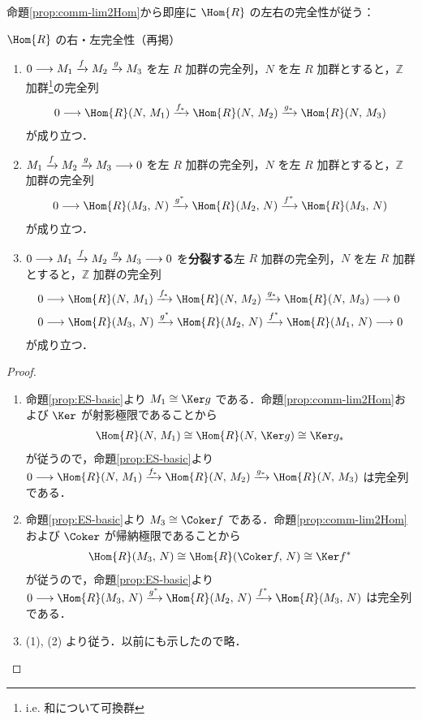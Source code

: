 \documentclass[algtopo_main]{subfiles}
\begin{document}
命題\ref{prop:comm-lim2Hom}から即座に $\Hom{R}$ の左右の完全性が従う：
\begin{mycol}[]{$\Hom{R}$ の右・左完全性（再掲）}
	\begin{enumerate}
        \item $0 \longrightarrow M_1 \xrightarrow{f} M_2 \xrightarrow{g} M_3$ を左 $R$ 加群の完全列，$N$ を左 $R$ 加群とすると，$\mathbb{Z}$ 加群\footnote{i.e. 和について可換群}の完全列
        \begin{align}
            0 \lto \Hom{R}(N,\, M_1) \xrightarrow{f_*} \Hom{R}(N,\, M_2) \xrightarrow{g_*} \Hom{R}(N,\, M_3)
        \end{align}
        が成り立つ．
        \item $M_1 \xrightarrow{f} M_2 \xrightarrow{g} M_3 \longrightarrow 0$ を左 $R$ 加群の完全列，$N$ を左 $R$ 加群とすると，$\mathbb{Z}$ 加群の完全列
        \begin{align}
            0 \lto \Hom{R}(M_3,\, N) \xrightarrow{g^*} \Hom{R}(M_2,\, N) \xrightarrow{f^*} \Hom{R}(M_3,\, N)
        \end{align}
        が成り立つ．
        \item $0 \longrightarrow M_1 \xrightarrow{f} M_2 \xrightarrow{g} M_3 \longrightarrow 0$ を\textbf{分裂する}左 $R$ 加群の完全列，$N$ を左 $R$ 加群とすると，$\mathbb{Z}$ 加群の完全列
        \begin{align}
            &0 \lto \Hom{R}(N,\, M_1) \xrightarrow{f_*} \Hom{R}(N,\, M_2) \xrightarrow{g_*} \Hom{R}(N,\, M_3) \lto 0\\
            &0 \lto \Hom{R}(M_3,\, N) \xrightarrow{g^*} \Hom{R}(M_2,\, N) \xrightarrow{f^*} \Hom{R}(M_1,\, N) \lto 0
        \end{align}
        が成り立つ．
    \end{enumerate}
\end{mycol}

\begin{proof}
	\begin{enumerate}
		\item 命題\ref{prop:ES-basic}より $M_1 \cong \Ker g$ である．命題\ref{prop:comm-lim2Hom}および $\Ker$ が射影極限であることから
		\begin{align}
			\Hom{R}(N,\, M_1) \cong \Hom{R}(N,\, \Ker g) \cong \Ker g_*
		\end{align}
		が従うので，命題\ref{prop:ES-basic}より $0 \lto \Hom{R}(N,\, M_1) \xrightarrow{f_*} \Hom{R}(N,\, M_2) \xrightarrow{g_*} \Hom{R}(N,\, M_3)$ は完全列である．
		\item 命題\ref{prop:ES-basic}より $M_3 \cong \Coker f$ である．命題\ref{prop:comm-lim2Hom}および $\Coker$ が帰納極限であることから
		\begin{align}
			\Hom{R}(M_3,\, N) \cong \Hom{R}(\Coker f,\, N) \cong \Ker f^*
		\end{align}
		が従うので，命題\ref{prop:ES-basic}より $0 \lto \Hom{R}(M_3,\, N) \xrightarrow{g^*} \Hom{R}(M_2,\, N) \xrightarrow{f^*} \Hom{R}(M_3,\, N)$ は完全列である．
		\item (1), (2) より従う．以前にも示したので略．
	\end{enumerate}
\end{proof}
\end{document}
